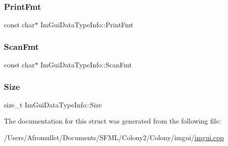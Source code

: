 \subsubsection{\texorpdfstring{Print\+Fmt}{PrintFmt}}
{\footnotesize\ttfamily const char$\ast$ Im\+Gui\+Data\+Type\+Info\+::\+Print\+Fmt}

\mbox{\label{struct_im_gui_data_type_info_aaa2d211e7cc5f03786f82650b69e9cf3}} 
\subsubsection{\texorpdfstring{Scan\+Fmt}{ScanFmt}}
{\footnotesize\ttfamily const char$\ast$ Im\+Gui\+Data\+Type\+Info\+::\+Scan\+Fmt}

\mbox{\label{struct_im_gui_data_type_info_a49a2b2d99b93b7db968a74d92380ecbf}} 
\subsubsection{\texorpdfstring{Size}{Size}}
{\footnotesize\ttfamily size\+\_\+t Im\+Gui\+Data\+Type\+Info\+::\+Size}



The documentation for this struct was generated from the following file\+:\begin{DoxyCompactItemize}
\item 
/\+Users/\+Afromullet/\+Documents/\+S\+F\+M\+L/\+Colony2/\+Colony/imgui/\mbox{\hyperlink{imgui_8cpp}{imgui.\+cpp}}\end{DoxyCompactItemize}
